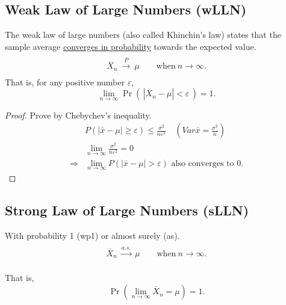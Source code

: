 \documentclass[11pt]{elegantbook}
\begin{document}
\subsection{Weak Law of Large Numbers (wLLN)}
\begin{theorem}
    The weak law of large numbers (also called Khinchin's law) states that the sample average \underline{converges in probability} towards the expected value.
    $${\displaystyle {\begin{matrix}{}\\{\overline {X}}_{n}\ {\xrightarrow {P}}\ \mu \qquad {\text{when}}\ n\to \infty .\\{}\end{matrix}}}$$
    That is, for any positive number $\varepsilon$,
    $${\displaystyle \lim _{n\to \infty }\Pr \!\left(\,|{\overline {X}}_{n}-\mu |<\varepsilon \,\right)=1.}$$
\end{theorem}
\begin{proof}
Prove by Chebychev's inequality.
$$
\begin{aligned}
&P(|\bar{x}-\mu|\geq\varepsilon) \leq \frac{\sigma^{2}}{n \varepsilon^{2}} \quad (Var\bar{x}=\frac{\sigma^{2}}{n}) \\
&\lim_{n \rightarrow \infty}\frac{\sigma^{2}}{n \varepsilon^{2}}=0\\
\Rightarrow&\lim_{n \rightarrow \infty}P(|\bar{x}-\mu|>\varepsilon) \text { also converges to } 0 .
\end{aligned}
$$
\end{proof}

\subsection{Strong Law of Large Numbers (sLLN)}
\begin{theorem}
    \quad

    With probability 1 (wp1) or almost surely (as).
    $${\displaystyle {\begin{matrix}{}\\{\overline {X}}_{n}\ {\xrightarrow {a.s.}}\ \mu \qquad {\text{when}}\ n\to \infty .\\{}\end{matrix}}}$$

    That is,
    $$\Pr \!\left(\lim _{n\to \infty }{\overline {X}}_{n}=\mu \right)=1.$$
\end{theorem}
\end{document}
